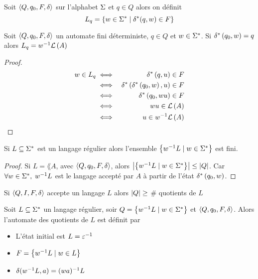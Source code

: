 \begin{definition}
	Soit $\langle Q, q_0, F, \delta \rangle$ sur l'alphabet $\Sigma$ et $q \in Q$ alors on définit
	$$ L_q = \left\{w \in \Sigma^{*} \mid \delta^{*} (q,w) \in F\right\} $$
\end{definition}


\begin{lemma}
	Soit $\langle Q, q_0, F, \delta \rangle$ un automate fini déterministe, $q \in Q$ et $w \in \Sigma^{*}$. Si $\delta^{*} \left(q_0,w\right) = q$ alors
	$L_q = w^{-1} \mathcal{L}\left(A\right)$
\end{lemma}

\begin{proof}
	\begin{eqnarray*}
		w \in L_q &\iff& \delta^{*} \left(q,u\right) \in F \\
		&\iff& \delta^{*} \left(\delta^{*} \left(q_0,w\right),u\right) \in F \\
		&\iff& \delta^{*} \left(q_0,wu\right) \in F \\
		&\iff& wu \in \mathcal{L}\left(A\right) \\
		&\iff& u \in w^{-1} \mathcal{L}\left(A\right)
	\end{eqnarray*}
\end{proof}

\begin{coro}
	Si $L \subseteq \Sigma^{*}$ est un langage régulier alors l'ensemble $\left\{w^{-1} L \mid w \in \Sigma^{*}\right\}$ est fini.
\end{coro}

\begin{proof}
	Si $L = \lang A$, avec $\langle Q, q_0, F, \delta \rangle$, alors $\left|\left\{w^{-1} L \mid w \in \Sigma^{*}\right\}\right| \leq \left|Q\right|$. Car $\forall w \in \Sigma^{*},$ $w^{-1} L$ est
	le langage accepté par $A$ à partir de l'état $\delta^{*} \left(q_0,w\right)$.
\end{proof}

\begin{coro} \label{coro:2}
	Si $\langle Q, I, F, \delta \rangle$ accepte un langage $L$ alors $\left|Q\right| \geq $ \# quotients de $L$
\end{coro}

\begin{definition} 

	Soit $L \subseteq \Sigma^{*}$ un langage régulier, soir $Q = \left\{w^{-1} L \mid w \in \Sigma^{*}\right\}$ et $\langle Q, q_0, F, \delta \rangle$. Alors l'automate des quotients de $L$
	est définit par

	\begin{itemize}
		\item L'état initial est $L = \varepsilon^{-1}$
		\item $F = \left\{w^{-1} L \mid w \in L\right\}$
		\item $\delta (w^{-1} L, a) = (wa)^{-1} L$
	\end{itemize}
\end{definition}


